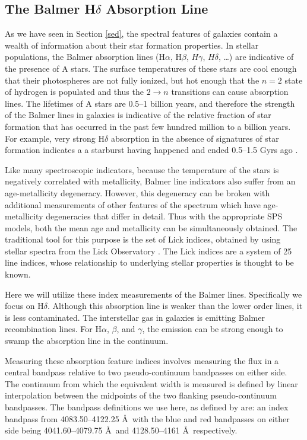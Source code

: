 \subsection{The Balmer H$\delta$ Absorption Line}
\label{hdelta}

As we have seen in Section \ref{sed}, the spectral features of 
galaxies contain a wealth of information about their star 
formation properties. In stellar populations, the Balmer 
absorption lines (H$\alpha$, H$\beta$, $H\gamma$, $H\delta$, \ldots)
are indicative of the presence of A stars. The surface 
temperatures of these stars are cool enough that their photospheres
are not fully ionized, but hot enough that the $n=2$ state of
hydrogen is populated and thus the $2\rightarrow n$ transitions 
can cause absorption lines. The lifetimes of A stars are 0.5--1 
billion years, and therefore the strength of the Balmer
lines in galaxies is indicative of the relative fraction of star
formation that has occurred in the past few hundred million to
a billion years. For example, very strong H$\delta$ absorption 
in the absence of signatures of star formation indicates a 
a starburst having happened and ended 0.5--1.5 Gyrs ago 
\citep{1983ApJ...270....7D}. 

Like many spectroscopic indicators,
because the temperature of the stars is negatively correlated 
with metallicity, Balmer line indicators also suffer from an
age-metallicity degeneracy. However, this degeneracy can be 
broken with additional measurements of other features of the 
spectrum which have age-metallicity degeneracies that differ
in detail. Thus with the appropriate SPS models, both the 
mean age and metallicity can be simultaneously obtained. 
The traditional tool for this purpose is the set of Lick indices, 
obtained by using stellar spectra from the Lick Observatory 
\citep{1997ApJS..111..377W, worthey_comprehensive_1994}. The 
Lick indices are a system of 25 line indices, whose 
relationship to underlying stellar properties is thought
to be known. 

Here we will utilize these index measurements of the Balmer 
lines. Specifically we focus on H$\delta$. Although this absorption
line is weaker than the lower order lines, it is less contaminated.
The interstellar gas in galaxies is emitting Balmer recombination
lines. For H$\alpha$, $\beta$, and $\gamma$, the emission can 
be strong enough to swamp the absorption line in the 
continuum. 

Measuring these absorption feature indices involves measuring 
the flux in a central bandpass relative to two pseudo-continuum 
bandpasses on either side. The continuum from 
which the equivalent width is measured is defined by linear
interpolation between the midpoints  of the two flanking pseudo-continuum 
bandpasses. The bandpass definitions we use here, as defined 
by \citet{worthey_comprehensive_1994} are: an index bandpass from 
4083.50--4122.25 \AA\ with the blue and red bandpasses on either side 
being 4041.60--4079.75 \AA\ and 4128.50--4161 \AA\ respectively.

